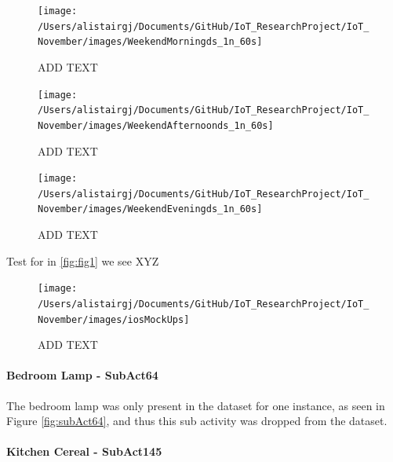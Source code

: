 \documentclass[11pt,]{article}
\let\oldparagraph\paragraph
\renewcommand{\paragraph}[1]{\oldparagraph{#1}\mbox{}}
\begin{document}
\begin{figure}[H]

{\centering \texttt{[image: /Users/alistairgj/Documents/GitHub/IoT\_ResearchProject/IoT\_November/images/WeekendMorningds\_1n\_60s]} 

}

\caption{ADD TEXT}\label{fig:unnamed-chunk-15}
\end{figure}

\begin{figure}[H]

{\centering \texttt{[image: /Users/alistairgj/Documents/GitHub/IoT\_ResearchProject/IoT\_November/images/WeekendAfternoonds\_1n\_60s]} 

}

\caption{ADD TEXT}\label{fig:unnamed-chunk-16}
\end{figure}

\begin{figure}[H]

{\centering \texttt{[image: /Users/alistairgj/Documents/GitHub/IoT\_ResearchProject/IoT\_November/images/WeekendEveningds\_1n\_60s]} 

}

\caption{ADD TEXT}\label{fig:unnamed-chunk-17}
\end{figure}

\pagebreak

Test for in \ref{fig:fig1} we see XYZ

\begin{figure}[H]

{\centering \texttt{[image: /Users/alistairgj/Documents/GitHub/IoT\_ResearchProject/IoT\_November/images/iosMockUps]} 

}

\caption{ADD TEXT}\label{fig:unnamed-chunk-18}
\end{figure}

\pagebreak

\pagebreak

\hypertarget{bedroom-lamp---subact64}{%
\paragraph{Bedroom Lamp - SubAct64}\label{bedroom-lamp---subact64}}

The bedroom lamp was only present in the dataset for one instance, as
seen in Figure \ref{fig:subAct64}, and thus this sub activity was
dropped from the dataset.

\hypertarget{kitchen-cereal---subact145}{%
\paragraph{Kitchen Cereal -
SubAct145}\label{kitchen-cereal---subact145}}
\end{document}
